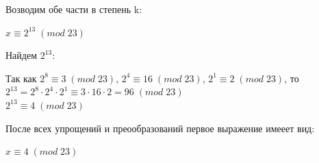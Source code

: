 \documentclass[12pt]{article}
\begin{document}
\begin{flushleft}
    \hspace{1.25cm}Возводим обе части в степень k: \\
        \begin{center}
            $ x \equiv 2^{13} \; (mod \; 23) $ \\
        \end{center}
    \hspace{1.25cm}Найдем $ 2^{13} $: \\
        \begin{center}
            Так как $ 2^8 \equiv 3 \; (mod \; 23) $, $ 2^4 \equiv 16 \; (mod \; 23) $, $ 2^1 \equiv 2 \; (mod \; 23) $, то \\
            $ 2^{13} = 2^8 \cdot 2^4 \cdot 2^1 \equiv 3 \cdot 16 \cdot 2 = 96 \; (mod \; 23) $ \\
            $ 2^{13} \equiv 4 \; (mod \; 23) $ \\
        \end{center}
    \hspace{1.25cm}После всех упрощений и преообразований первое выражение имееет вид: \\
        \begin{center}
            $ x \equiv 4 \; (mod \; 23) $ \\
        \end{center}


\end{flushleft}
\end{document}
